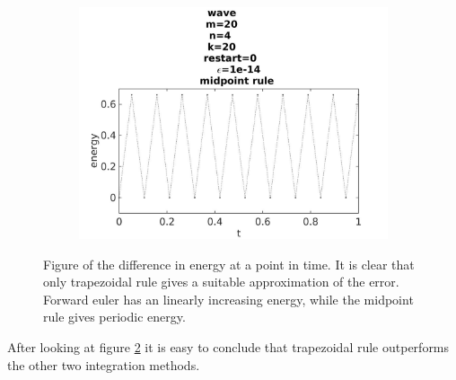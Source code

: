 \begin{figure}[H]
\begin{subfigure}[b]{0.30\textwidth}
                \includegraphics[width=\textwidth]{../MATLAB/fig/energyovertimemidpoint.jpg}
                \caption{  }
                \label{fig:errormid}
        \end{subfigure}
        \caption{Figure of the difference in energy at a point in time. It is clear that only trapezoidal rule gives a suitable approximation of the error. Forward euler has an linearly increasing energy, while the midpoint rule gives periodic energy.}
        \label{fig:error}
\end{figure}
After looking at figure \ref{fig:error} it is easy to conclude that trapezoidal rule outperforms the other two integration methods.